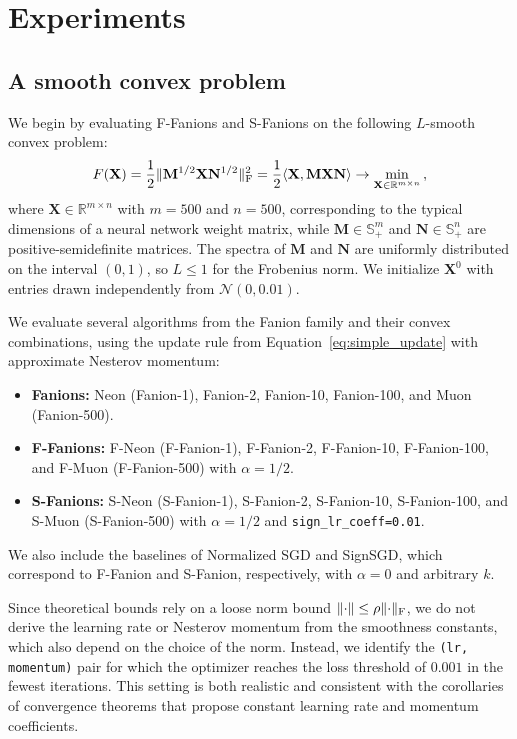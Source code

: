 \documentclass[a4paper,14pt,oneside]{extarticle}
\newcommand{\R}{\mathbb{R}} %
\newcommand{\norm}[1]{\lVert #1\rVert}
\DeclarePairedDelimiter{\normf}{\|}{\|_\mathrm{F}}
\def\<#1,#2>{\langle #1,#2\rangle}
\newcommand{\Rmn}{\R^{m\times n}}
\newcommand{\mX}{\mathbf{X}}
\newcommand{\mM}{\mathbf{M}}
\newcommand{\mN}{\mathbf{N}}
\newcommand{\cN}{\mathcal{N}}
\newcommand{\equationref}[1]{Equation~\ref{#1}}
\begin{document}
\section{Experiments}\label{sec:experiments}

\subsection{A smooth convex problem}
\label{subsec:lls_exps}

We begin by evaluating F-Fanions and S-Fanions on the following $L$-smooth convex problem:
\begin{equation}\label{eq:lls}
  F(\mX) = \frac{1}{2}\normf{\mM^{1/2}\mX\mN^{1/2}}^2 = \frac{1}{2} \<\mX, \mM \mX \mN> \to \min_{\mX \in \Rmn}\,,
\end{equation}
where $\mX \in \Rmn$ with $m=500$ and $n=500$, corresponding to the typical dimensions of a neural network weight matrix, while $\mM \in \mathbb{S}^m_{+}$ and $\mN \in \mathbb{S}^n_{+}$ are positive-semidefinite matrices. The spectra of $\mM$ and $\mN$ are uniformly distributed on the interval $(0, 1)$, so $L \le 1$ for the Frobenius norm. We initialize $\mX^0$ with entries drawn independently from $\cN(0, 0.01)$.

We evaluate several algorithms from the Fanion family and their convex combinations, using the update rule from \equationref{eq:simple_update} with approximate Nesterov momentum:
\begin{itemize}
  \item \textbf{Fanions:} Neon (Fanion-1), Fanion-2, Fanion-10, Fanion-100, and Muon (Fanion-500).
  \item \textbf{F-Fanions:} F-Neon (F-Fanion-1), F-Fanion-2, F-Fanion-10, F-Fanion-100, and F-Muon (F-Fanion-500) with $\alpha=1/2$.
  \item \textbf{S-Fanions:} S-Neon (S-Fanion-1), S-Fanion-2, S-Fanion-10, S-Fanion-100, and S-Muon (S-Fanion-500) with $\alpha=1/2$ and \texttt{sign\_lr\_coeff=0.01}.
\end{itemize}
We also include the baselines of Normalized SGD and SignSGD, which correspond to F-Fanion and S-Fanion, respectively, with $\alpha = 0$ and arbitrary $k$.

Since theoretical bounds \citep{kovalev2025understanding, riabinin2025gluon} rely on a loose norm bound $\norm{\cdot}\le \rho \normf{\cdot}$, we do not derive the learning rate or Nesterov momentum from the smoothness constants, which also depend on the choice of the norm. Instead, we identify the \texttt{(lr, momentum)} pair for which the optimizer reaches the loss threshold of $0.001$ in the fewest iterations. This setting is both realistic and consistent with the corollaries of convergence theorems that propose constant learning rate and momentum coefficients.
\end{document}
